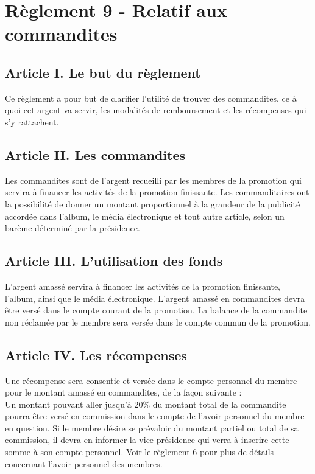 
\section*{Règlement 9 - Relatif aux commandites} 

\subsection*{Article I. Le but du règlement}
Ce règlement a pour but de clarifier l'utilité de trouver des commandites, ce à quoi cet argent va servir, les modalités de remboursement et les récompenses qui s'y rattachent. 

\subsection*{Article II. Les commandites}
Les commandites sont de l’argent recueilli par les membres de la promotion qui servira à financer les activités de la promotion finissante. Les commanditaires ont la possibilité de donner un montant proportionnel à la grandeur de la publicité accordée dans l’album, le média électronique et tout autre article, selon un barème déterminé par la présidence. 

\subsection*{Article III. L'utilisation des fonds}
L'argent amassé servira à financer les activités de la promotion finissante, l’album, ainsi que le média électronique. L’argent amassé en commandites devra être versé dans le compte courant de la promotion. La balance de la commandite non réclamée par le membre sera versée dans le compte commun de la promotion.

\subsection*{Article IV. Les récompenses}
Une récompense sera consentie et versée dans le compte personnel du membre pour le montant amassé en commandites, de la façon suivante :\\

Un montant pouvant aller jusqu’à 20\% du montant total de la commandite pourra être versé en commission dans le compte de l’avoir personnel du membre en question. Si le membre désire se prévaloir du montant partiel ou total de sa commission, il devra en informer la vice-présidence qui verra à inscrire cette somme à son compte personnel. Voir le règlement 6 pour plus de détails concernant l’avoir personnel des membres. \\


